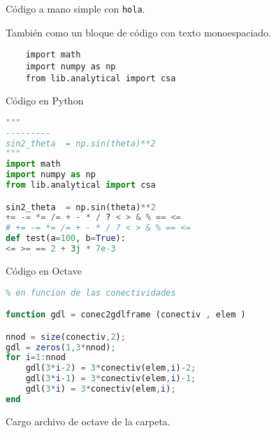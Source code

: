 \documentclass[12pt]{article}
\begin{document}
	
Código a mano simple con \verb|hola|.

También como un bloque de código con texto monoespaciado.
\begin{verbatim}
	import math
	import numpy as np
	from lib.analytical import csa
\end{verbatim}	

\lstlistoflistings
	

Código en Python

\begin{lstlisting}[language=Python, caption={Código en Python.}]
"""
---------
sin2_theta  = np.sin(theta)**2
"""
import math
import numpy as np
from lib.analytical import csa

sin2_theta  = np.sin(theta)**2
+= -= *= /= + - * / ? < > & % == <=
# += -= *= /= + - * / ? < > & % == <=
def test(a=100, b=True):
<= >= == 2 + 3j * 7e-3
\end{lstlisting}

Código en Octave

\begin{lstlisting}[language=Octave]
% Funcion que calcula los grados de libertad de un elemento 
% en funcion de las conectividades

function gdl = conec2gdlframe (conectiv , elem )

nnod = size(conectiv,2); 
gdl = zeros(1,3*nnod);
for i=1:nnod
	gdl(3*i-2) = 3*conectiv(elem,i)-2;
	gdl(3*i-1) = 3*conectiv(elem,i)-1;
	gdl(3*i) = 3*conectiv(elem,i);
end
\end{lstlisting}

Cargo archivo de octave de la carpeta.

\end{document}
